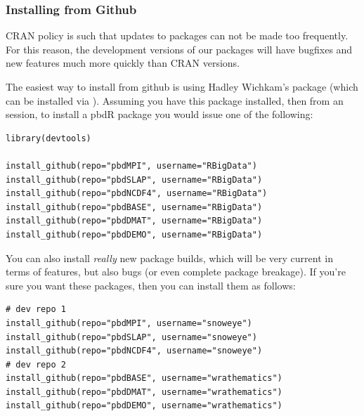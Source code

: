 \subsubsection{Installing from Github}
CRAN policy is such that updates to packages can not be made too frequently.  For this reason, the development versions of our packages will have bugfixes and new features much more quickly than CRAN versions.  

The easiest way to install from github is using Hadley Wichkam's  package (which can be installed via ).  Assuming you have this package installed, then from an  session, to install a pbdR package you would issue one of the following:

\begin{lstlisting}[language=rr]
library(devtools)

install_github(repo="pbdMPI", username="RBigData")
install_github(repo="pbdSLAP", username="RBigData")
install_github(repo="pbdNCDF4", username="RBigData")
install_github(repo="pbdBASE", username="RBigData")
install_github(repo="pbdDMAT", username="RBigData")
install_github(repo="pbdDEMO", username="RBigData")
\end{lstlisting}

You can also install \emph{really} new package builds, which will be very current in terms of features, but also bugs (or even complete package breakage).  If you're sure you want these packages, then you can install them as follows:

\begin{lstlisting}[language=rr]
# dev repo 1
install_github(repo="pbdMPI", username="snoweye")
install_github(repo="pbdSLAP", username="snoweye")
install_github(repo="pbdNCDF4", username="snoweye")
# dev repo 2
install_github(repo="pbdBASE", username="wrathematics")
install_github(repo="pbdDMAT", username="wrathematics")
install_github(repo="pbdDEMO", username="wrathematics")
\end{lstlisting}
